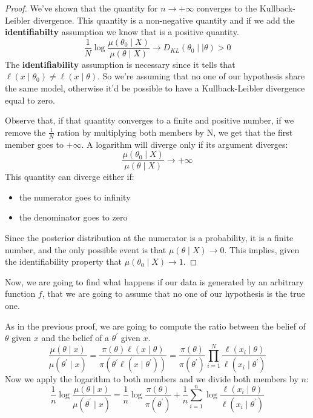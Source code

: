 \begin{proof}
    We've shown that the quantity for $n \to +\infty$ converges to the Kullback-Leibler divergence. This quantity is a non-negative quantity and if we add the \textbf{identifiabilty} assumption we know that is a positive quantity.
    \[
        \frac{1}{N} \log\frac{\mu(\theta_0 \mid X)}{\mu(\theta \mid X)} \to D_{KL} (\theta_0 \mid \mid \theta) > 0
    \]
    The \textbf{identifiability} assumption is necessary since it tells that $\ell(x\mid \theta_0) \neq \ell(x \mid \theta)$. So we're assuming that no one of our hypothesis share the same model, otherwise it'd be possible to have a Kullback-Leibler divergence equal to zero.

    Observe that, if that quantity converges to a finite and positive number, if we remove the $\frac 1N$ ration by multiplying both members by N, we get that the first member goes to $+\infty$. 
    A logarithm will diverge only if its argument diverges:
    \[
        \frac{\mu(\theta_0 \mid X)}{\mu(\theta \mid X)} \to +\infty
    \]
    This quantity can diverge either if:
    \begin{itemize}
        \item the numerator goes to infinity 
        \item the denominator goes to zero
    \end{itemize}
    
    Since the posterior distribution at the numerator is a probability, it is a finite number, and the only possible event is that $\mu(\theta\mid X) \to 0 $. This implies, given the identifiability property that $\mu(\theta_0 \mid X) \to 1$.
\end{proof}


Now, we are going to find what happens if our data is generated by an arbitrary function $f$, that we are going to assume that no one of our hypothesis is the true one. 

As in the previous proof, we are going to compute the ratio between the belief of $\theta$ given $x$ and the belief of a $\theta^{\prime}$ given $x$.
\[
    \frac{\mu(\theta \mid x)}{\mu(\theta^{\prime} \mid x)} = \frac{\pi(\theta) \ell(x \mid \theta)}{\pi(\theta^{\prime} \ell(x \mid \theta^{\prime} ))} = \frac{\pi(\theta)}{\pi(\theta^{\prime} )} \prod_{i=1}^N \frac{\ell(x_i \mid \theta)}{\ell(x_i \mid \theta^{\prime} )}
\]
Now we apply the logarithm to both members and we divide both members by $n$:
\[
    \frac{1}{n} \log \frac{\mu(\theta \mid x)}{\mu(\theta^{\prime} \mid x)} = \frac{1}{n} \log \frac{\pi(\theta)}{\pi(\theta^{\prime} )} +  \frac{1}{n} \sum_{i=1}^n \log \frac{\ell(x_i \mid \theta)}{\ell(x_i \mid \theta^{\prime} )}
\]

